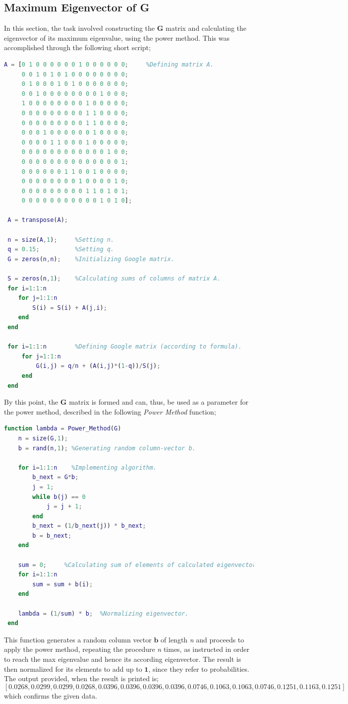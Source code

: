\documentclass{article}
\begin{document}
\subsection{Maximum Eigenvector of G}
In this section, the task involved constructing the $\mathbf{G}$ matrix and calculating the eigenvector of its maximum eigenvalue, using the power method. This was accomplished through the following short script;
\begin{lstlisting}[language=Matlab]
A = [0 1 0 0 0 0 0 0 1 0 0 0 0 0 0;     %Defining matrix A.
     0 0 1 0 1 0 1 0 0 0 0 0 0 0 0;
     0 1 0 0 0 1 0 1 0 0 0 0 0 0 0;
     0 0 1 0 0 0 0 0 0 0 0 1 0 0 0;
     1 0 0 0 0 0 0 0 0 1 0 0 0 0 0;
     0 0 0 0 0 0 0 0 0 1 1 0 0 0 0;
     0 0 0 0 0 0 0 0 0 1 1 0 0 0 0;
     0 0 0 1 0 0 0 0 0 0 1 0 0 0 0;
     0 0 0 0 1 1 0 0 0 1 0 0 0 0 0;
     0 0 0 0 0 0 0 0 0 0 0 0 1 0 0;
     0 0 0 0 0 0 0 0 0 0 0 0 0 0 1;
     0 0 0 0 0 0 1 1 0 0 1 0 0 0 0;
     0 0 0 0 0 0 0 0 1 0 0 0 0 1 0;
     0 0 0 0 0 0 0 0 0 1 1 0 1 0 1;
     0 0 0 0 0 0 0 0 0 0 0 1 0 1 0];
 
 A = transpose(A);  
 
 n = size(A,1);     %Setting n.
 q = 0.15;          %Setting q.
 G = zeros(n,n);    %Initializing Google matrix.
 
 S = zeros(n,1);    %Calculating sums of columns of matrix A.
 for i=1:1:n
    for j=1:1:n
        S(i) = S(i) + A(j,i);
    end
 end
 
 for i=1:1:n        %Defining Google matrix (according to formula).
     for j=1:1:n 
         G(i,j) = q/n + (A(i,j)*(1-q))/S(j);
     end
 end
\end{lstlisting}
By this point, the $\mathbf{G}$ matrix is formed and can, thus, be used as a parameter for the power method, described in the following \emph{Power Method} function;
\begin{lstlisting}[language=Matlab]
function lambda = Power_Method(G)
    n = size(G,1);
    b = rand(n,1); %Generating random column-vector b.
    
    for i=1:1:n    %Implementing algorithm.
        b_next = G*b;
        j = 1;
        while b(j) == 0
            j = j + 1;
        end
        b_next = (1/b_next(j)) * b_next;
        b = b_next;
    end
    
    sum = 0;     %Calculating sum of elements of calculated eigenvector.
    for i=1:1:n
        sum = sum + b(i);
    end
    
    lambda = (1/sum) * b;  %Normalizing eigenvector.
 end
\end{lstlisting}
This function generates a random column vector $\mathbf{b}$ of length \emph{n} and proceeds to apply the power method, repeating the procedure \emph{n} times, as instructed in order to reach the max eigenvalue and hence its according eigenvector. The result is then normalized for its elements to add up to $\mathbf{1}$, since they refer to probabilities. The output provided, when the result is printed is;
\[[0.0268,0.0299,0.0299,0.0268,0.0396,0.0396,0.0396,0.0396,0.0746,0.1063,0.1063,0.0746,0.1251,0.1163,0.1251]\]
which confirms the given data.
\pagebreak
\end{document}
